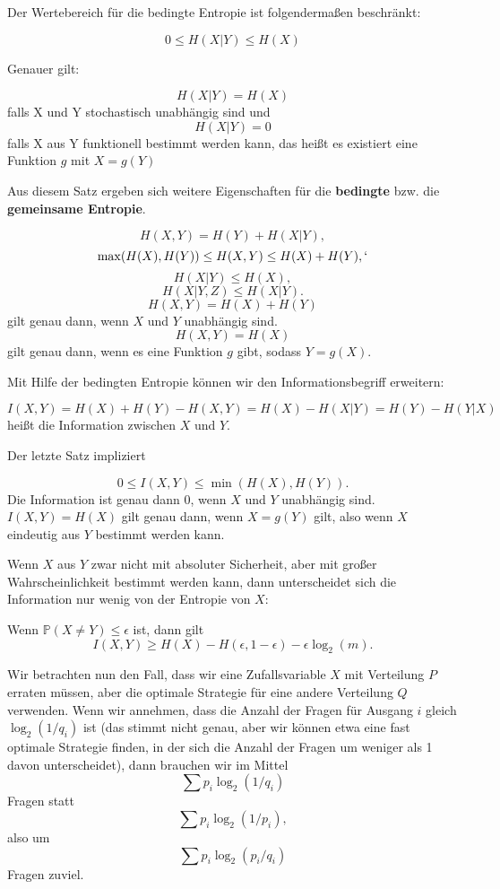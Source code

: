 Der Wertebereich für die bedingte Entropie ist folgendermaßen beschränkt:

\[ 0 \le H(X|Y) \le H(X)\]

Genauer gilt:
\begin{satz}
\[H(X|Y) = H(X)\]
falls X und Y stochastisch unabhängig sind und
\[H(X|Y) = 0\]
falls X aus Y funktionell bestimmt werden kann, das heißt es existiert eine Funktion $g$ mit $X = g(Y)$
\end{satz}
Aus diesem Satz ergeben sich weitere Eigenschaften für die \textbf{bedingte} bzw. die \textbf{gemeinsame Entropie}.
\begin{satz}
\[H(X,Y)=H(Y)+H(X|Y),\]
\[\max(H(X),H(Y))\le H(X,Y)\le H(X)+H(Y),`\]
\[H(X|Y)\le H(X),\]
\[H(X|Y,Z)\le H(X|Y).\]
\[H(X,Y)=H(X)+H(Y)\]
gilt genau dann, wenn $X$ und $Y$ unabhängig sind.
\[H(X,Y)=H(X)\]
gilt genau dann, wenn es eine Funktion $g$ gibt, sodass $Y=g(X)$.
\end{satz}
Mit Hilfe der bedingten Entropie können wir den Informationsbegriff erweitern:
\begin{definition}
\[I(X,Y)=H(X)+H(Y)-H(X,Y)=H(X)-H(X|Y)=H(Y)-H(Y|X)\]
heißt die Information zwischen $X$ und $Y$.
\end{definition}
Der letzte Satz impliziert
\begin{satz}
\[0\le I(X,Y)\le\min(H(X),H(Y)).\]
Die Information ist genau dann 0, wenn $X$ und $Y$ unabhängig sind.
$I(X,Y)=H(X)$ gilt genau dann, wenn $X=g(Y)$ gilt, also wenn
$X$ eindeutig aus $Y$ bestimmt werden kann.
\end{satz}
Wenn $X$ aus $Y$ zwar nicht mit absoluter Sicherheit, aber mit großer Wahrscheinlichkeit bestimmt werden kann, dann unterscheidet sich die Information
nur wenig von der Entropie von $X$:
\begin{satz}
Wenn $\mathbb P(X\neq Y)\le \epsilon$ ist, dann gilt
\[I(X,Y)\ge H(X)-H(\epsilon, 1-\epsilon)-\epsilon\log_2(m).\]
\end{satz}

Wir betrachten nun den Fall, dass wir eine Zufallsvariable $X$ mit 
Verteilung $P$ erraten müssen, aber die optimale Strategie für
eine andere Verteilung $Q$ verwenden. Wenn wir annehmen, dass
die Anzahl der Fragen für Ausgang $i$ gleich $\log_2(1/q_i)$ ist (das stimmt 
nicht genau, aber wir können etwa eine fast optimale
Strategie finden, in der sich die
Anzahl der Fragen um weniger als 1 davon unterscheidet), dann
brauchen wir im Mittel
\[\sum p_i \log_2(1/q_i)\]
Fragen statt
\[\sum p_i\log_2(1/p_i),\]
also um
\[\sum p_i\log_2(p_i/q_i)\] Fragen zuviel.

